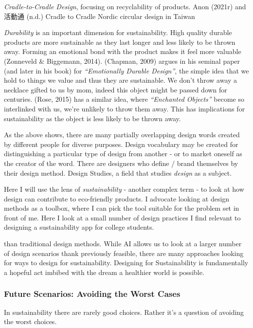 \documentclass[
  letterpaper,
  DIV=11,
  numbers=noendperiod]{scrartcl}
\begin{document}
\emph{Cradle-to-Cradle Design}, focusing on recyclability of products.
Anon (2021r) and 活動通 (n.d.) Cradle to Cradle Nordic circular design
in Taiwan

\emph{Durability} is an important dimension for sustainability. High
quality durable products are more sustainable as they last longer and
less likely to be thrown away. Forming an emotional bond with the
product makes it feel more valuable (Zonneveld \& Biggemann, 2014).
(Chapman, 2009) argues in his seminal paper (and later in his book) for
\emph{``Emotionally Durable Design''}, the simple idea that we hold to
things we value and thus they are sustainable. We don't throw away a
necklace gifted to us by mom, indeed this object might be passed down
for centuries. (Rose, 2015) has a similar idea, where \emph{``Enchanted
Objects''} become so interlinked with us, we're unlikely to throw them
away. This has implications for sustainability as the object is less
likely to be thrown away.

As the above shows, there are many partially overlapping design words
created by different people for diverse purposes. Design vocabulary may
be created for distinguishing a particular type of design from another -
or to market oneself as the creator of the word. There are designers who
define / brand themselves by their design method. Design Studies, a
field that studies \emph{design} as a subject.

Here I will use the lens of \emph{sustainability} - another complex term
- to look at how design can contribute to eco-friendly products. I
advocate looking at design methods as a toolbox, where I can pick the
tool suitable for the problem set in front of me. Here I look at a small
number of design practices I find relevant to designing a sustainability
app for college students.

than traditional design methods. While AI allows us to look at a larger
number of design scenarios thank previously feasible, there are many
approaches looking for ways to design for sustainability. Designing for
Sustainability is fundamentally a hopeful act imbibed with the dream a
healthier world is possible.

\subsubsection{Future Scenarios: Avoiding the Worst
Cases}\label{future-scenarios-avoiding-the-worst-cases}

In sustainability there are rarely good choices. Rather it's a question
of avoiding the worst choices.
\end{document}
